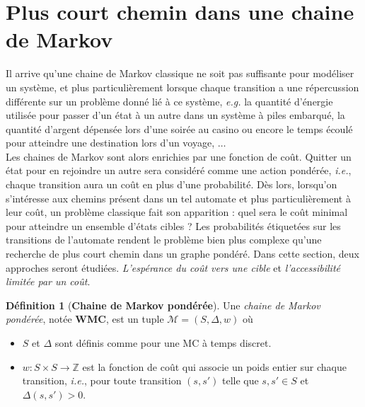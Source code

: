 \documentclass[12pt,a4paper]{report}
\theoremstyle{definition}%
\newtheorem{definition}{Définition}[chapter]
\theoremstyle{remark}
\newcommand{\eg}{\textit{e.g.} }
\newcommand{\ie}{\textit{i.e.}, }
\let\labelitemi\labelitemii
\begin{document}
\section{Plus court chemin dans une chaine de Markov}
Il arrive qu'une chaine de Markov classique ne soit pas suffisante pour modéliser un système, et plus particulièrement lorsque chaque transition a une répercussion différente sur un problème donné lié à ce système, \eg la quantité d'énergie utilisée pour passer d'un état à un autre dans un système à piles embarqué, la quantité d'argent dépensée lors d'une soirée au casino ou encore le temps écoulé pour atteindre une destination lors d'un voyage, $\dots$ \\
Les chaines de Markov sont alors enrichies par une fonction de coût. Quitter un état pour en rejoindre un autre sera considéré comme une action pondérée, \ie chaque transition aura un coût en plus d'une probabilité. Dès lors, lorsqu'on s'intéresse aux chemins présent dans un tel automate et plus particulièrement à leur coût, un problème classique fait son apparition : quel sera le coût minimal pour atteindre un ensemble d'états cibles ? Les probabilités étiquetées sur les transitions de l'automate rendent le problème bien plus complexe qu'une recherche de plus court chemin dans un graphe pondéré. Dans cette section, deux approches seront étudiées. \textit{L'espérance du coût vers une cible} et \textit{l'accessibilité limitée par un coût}.

\begin{definition}[\textbf{Chaine de Markov pondérée}]
	Une \textit{chaine de Markov pondérée}, notée \textbf{WMC}, est un tuple $\mathcal{M} = (S, \Delta, w)$ où
	\begin{itemize}
		\renewcommand{\labelitemi}{\tiny$\bullet$}
		\item $S$ et $\Delta$ sont définis comme pour une MC à temps discret.
		\item $w: S\times S \rightarrow \mathbb{Z}$ est la fonction de coût qui associe un poids entier sur chaque  transition, \ie pour toute transition $(s, s')$ telle que $s, s' \in S$ et $\Delta(s, s') > 0$.
	\end{itemize}
\end{definition}
\end{document}
